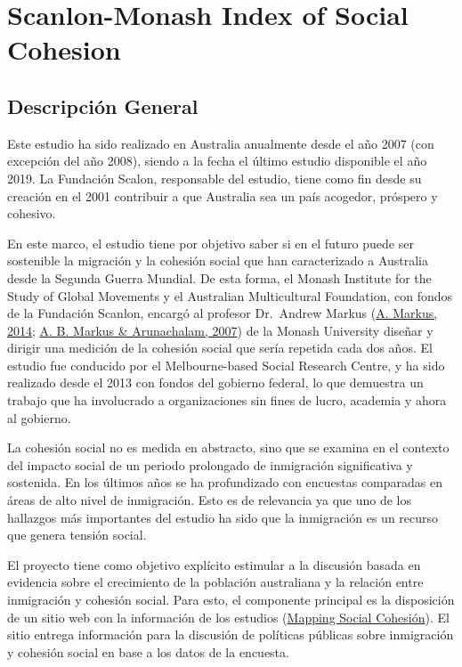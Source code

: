 \documentclass[
  12pt,
]{book}
\begin{document}
\hypertarget{scanlon-monash-index-of-social-cohesion}{%
\chapter{Scanlon-Monash Index of Social Cohesion}\label{scanlon-monash-index-of-social-cohesion}}

\hypertarget{descripciuxf3n-general-1}{%
\section{Descripción General}\label{descripciuxf3n-general-1}}

Este estudio ha sido realizado en Australia anualmente desde el año 2007 (con excepción del año 2008), siendo a la fecha el último estudio disponible el año 2019. La Fundación Scalon, responsable del estudio, tiene como fin desde
su creación en el 2001 contribuir a que Australia sea un país acogedor,
próspero y cohesivo.

En este marco, el estudio tiene por objetivo saber si en el futuro puede ser sostenible la migración y la cohesión social que han caracterizado a Australia desde la Segunda Guerra Mundial. De esta forma, el Monash Institute for the Study of Global Movements y el Australian Multicultural Foundation, con fondos de la Fundación Scanlon, encargó al profesor Dr.~Andrew Markus (\protect\hyperlink{ref-markus2013mapping}{A. Markus, 2014}; \protect\hyperlink{ref-markus_Attitudinal_2007}{A. B. Markus \& Arunachalam, 2007}) de la Monash University diseñar y dirigir una medición de la cohesión social que sería repetida cada dos años. El estudio fue conducido por el Melbourne-based Social Research Centre, y ha sido realizado desde el 2013 con fondos del gobierno federal, lo que demuestra un trabajo que ha involucrado a organizaciones sin fines de lucro, academia y ahora al gobierno.

La cohesión social no es medida en abstracto, sino que se examina en el contexto del impacto social de un periodo prolongado de inmigración significativa y sostenida. En los últimos años se ha profundizado con encuestas comparadas en áreas de alto nivel de inmigración. Esto es de relevancia ya que uno de los hallazgos más importantes del estudio ha sido que la inmigración es un recurso que genera tensión social.

El proyecto tiene como objetivo explícito estimular a la discusión basada en evidencia sobre el crecimiento de la población australiana y la relación entre inmigración y cohesión social. Para esto, el componente principal es la disposición de un sitio web con la información de los estudios (\href{https://scanlonfoundation.org.au/mapping-social-cohesion/}{Mapping Social Cohesión}). El sitio entrega información para la discusión de políticas públicas sobre inmigración y cohesión social en base a los datos de la encuesta.
\end{document}
